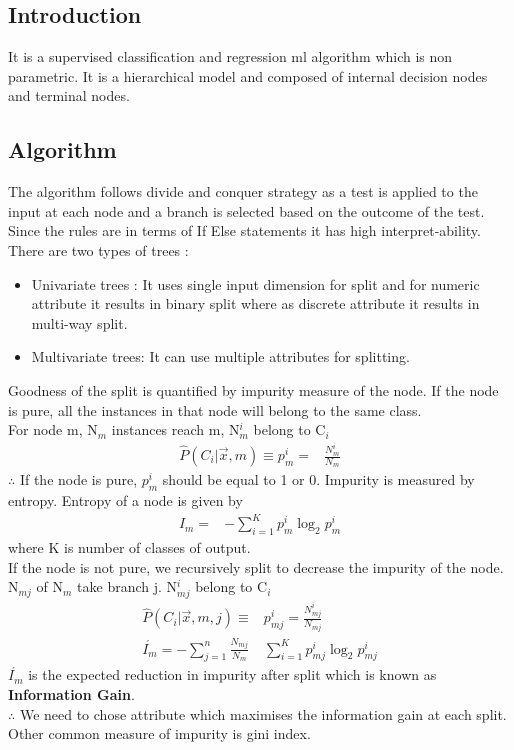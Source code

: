 \documentclass[12pt,letterpaper, onecolumn]{exam}
\begin{document}
\subsection*{Introduction}
It is a supervised classification and regression ml algorithm which is non parametric. It is a hierarchical model and composed of internal decision nodes and terminal nodes.
\subsection*{Algorithm}
The algorithm follows divide and conquer strategy as a test is applied to the input at each node and a branch is selected based on the outcome of the test. Since the rules are in terms of If Else statements it has high interpret-ability.
There are two types of trees :
\begin{itemize}
\item Univariate trees : It uses single input dimension for split and  for numeric attribute it results in binary split where as discrete attribute it results in multi-way split.
\item Multivariate trees: It can use multiple attributes for splitting.
\end{itemize}
Goodness of the split is quantified by impurity measure of the node. If the node is pure, all the instances in that node will belong to the same class.\\
For node m, N$_{m}$ instances reach m, N$^{i}_{m}$ belong to C$_{i}$
\begin{align}
\hat{P}(C_i | \vec{x},m) \equiv p^i_m = {}& \frac{N^i_m}{N_m}
\end{align}
$\therefore$ If the node is pure, $p^i_m $ should be equal to 1 or 0.
Impurity is measured by entropy. Entropy of a node is given by
\begin{align}
I_m ={}& -\sum_{i=1}^K p^i_m \log_2{p^i_m}
\end{align}
where K is number of classes of output.\\
If the node is not pure, we recursively split to decrease the impurity of the node.\\
 N$_{mj}$ of N$_{m}$ take branch j. N$^i_{mj}$ belong to C$_i$
 \begin{align}
 \hat{P}(C_i | \vec{x},m,j) \equiv {}&p^i_{mj} =  \frac{N^i_{mj}}{N_{mj}}\\
 \acute{I_m} = -\sum_{j = 1}^n\frac{N_{mj}}{N_{m}}{}&\sum_{i=1}^K p^i_{mj} \log_2{p^i_{mj}}
 \end{align}
 $\acute{I_m}$ is the expected reduction in impurity after split which is known as \\\textbf{Information Gain}.\\
 $\therefore$ We need to chose attribute which maximises the information gain at each split.\\
Other common measure of impurity is gini index.
\end{document}
